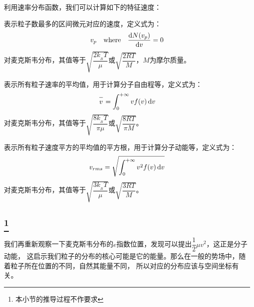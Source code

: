             利用速率分布函数，我们可以计算如下的特征速度：
            \begin{Itemize}
                \item {} 表示粒子数最多的区间微元对应的速度，定义式为：
                \begin{equation}
                    v_{p} \quad \text{where} \quad \frac{\dif N({v_{p}})}{\dif{v}} = 0
                    \nonumber
                \end{equation}
                对麦克斯韦分布，其值等于$\sqrt{\dfrac{2k_{_B}T}{\mu}}$或$\sqrt{\dfrac{2RT}{M}}$，$M$为摩尔质量。
                \item {} 表示所有粒子速率的平均值，用于计算分子自由程等，定义式为：
                \begin{equation}
                    \upperline{v} = \int_{0}^{+\infty} vf(v) \dif v
                    \nonumber
                \end{equation}
                对麦克斯韦分布，其值等于$\sqrt{\dfrac{8k_{_B}T}{\pi \mu}}$或$\sqrt{\dfrac{8RT}{\pi M}}$。
                \item {} 表示所有粒子速度平方的平均值的平方根，用于计算分子动能等，定义式为：
                \begin{equation}
                    v_{rms} = \sqrt{\int_{0}^{+\infty} v^{2}f(v)\dif v}
                    \nonumber
                \end{equation}
                对麦克斯韦分布，其值等于$\sqrt{\dfrac{3k_{_B}T}{\mu}}$或$\sqrt{\dfrac{3RT}{M}}$。
            \end{Itemize}
        \subsection[玻尔兹曼分布]{\footnote{本小节的推导过程不作要求}}
            我们再重新观察一下麦克斯韦分布的$e$指数位置，发现可以提出$\dfrac{1}{2}\mu v^{2}$，这正是分子动能，
            这启示我们粒子的分布的核心可能是它的能量。那么在一般的势场中，随着粒子所在位置的不同，自然其能量不同，
            所以对应的分布应该与空间坐标有关。

